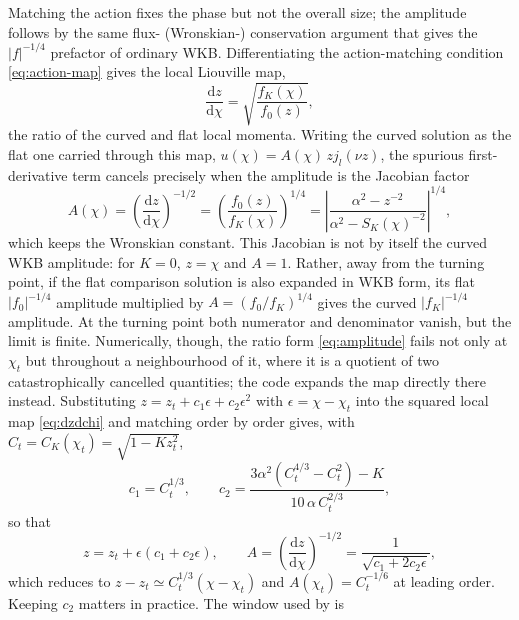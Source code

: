 \documentclass[11pt,a4paper]{article}
\newcommand{\dd}{\mathrm{d}}
\newcommand{\code}[1]{\texttt{\detokenize{#1}}}
\newcommand{\SK}{S_K}
\newcommand{\CK}{C_K}
\begin{document}
Matching the action fixes the phase but not the overall size; the amplitude
follows by the same flux- (Wronskian-) conservation argument that gives the
\(|f|^{-1/4}\) prefactor of ordinary WKB.  Differentiating the action-matching
condition \eqref{eq:action-map} gives the local Liouville map,
\begin{equation}
  \frac{\dd z}{\dd\chi}=\sqrt{\frac{f_K(\chi)}{f_0(z)}},
  \label{eq:dzdchi}
\end{equation}
the ratio of the curved and flat local momenta.  Writing the curved solution as
the flat one carried through this map, \(u(\chi)=A(\chi)\,zj_l(\nu z)\), the
spurious first-derivative term cancels precisely when the amplitude is the
Jacobian factor
\begin{equation}
  A(\chi)=\left(\frac{\dd z}{\dd\chi}\right)^{-1/2}
  =\left(\frac{f_0(z)}{f_K(\chi)}\right)^{1/4}
  =\left|
  \frac{\alpha^2-z^{-2}}{\alpha^2-\SK(\chi)^{-2}}
  \right|^{1/4},
  \label{eq:amplitude}
\end{equation}
which keeps the Wronskian constant.  This Jacobian is not by itself the curved
WKB amplitude: for \(K=0\), \(z=\chi\) and \(A=1\).  Rather, away from the
turning point, if the flat comparison solution is also expanded in WKB form, its
flat \(|f_0|^{-1/4}\) amplitude multiplied by \(A=(f_0/f_K)^{1/4}\) gives the
curved \(|f_K|^{-1/4}\) amplitude.
At the turning point both numerator and denominator vanish, but the limit is
finite.  Numerically, though, the ratio form \eqref{eq:amplitude} fails not only
at \(\chi_t\) but throughout a neighbourhood of it, where it is a quotient of two
catastrophically cancelled quantities; the code expands the map directly there
instead.  Substituting \(z=z_t+c_1\epsilon+c_2\epsilon^2\) with
\(\epsilon=\chi-\chi_t\) into the squared local map \eqref{eq:dzdchi} and
matching order by order gives, with \(C_t=\CK(\chi_t)=\sqrt{1-Kz_t^2}\),
\begin{equation}
  c_1=C_t^{1/3},\qquad
  c_2=\frac{3\alpha^2\left(C_t^{4/3}-C_t^{2}\right)-K}{10\,\alpha\,C_t^{2/3}},
  \label{eq:turning-limit}
\end{equation}
so that
\begin{equation}
  z=z_t+\epsilon\left(c_1+c_2\epsilon\right),\qquad
  A=\left(\frac{\dd z}{\dd\chi}\right)^{-1/2}
   =\frac{1}{\sqrt{c_1+2c_2\epsilon}},
  \label{eq:turning-expansion}
\end{equation}
which reduces to \(z-z_t\simeq C_t^{1/3}(\chi-\chi_t)\) and
\(A(\chi_t)=C_t^{-1/6}\) at leading order.  Keeping \(c_2\) matters in practice.
The window used by \code{compute_olver_z_amp} is
\end{document}
